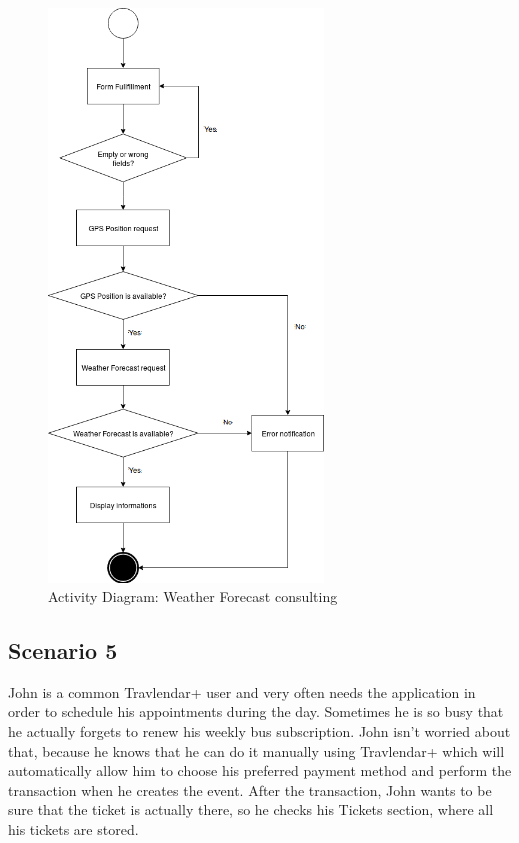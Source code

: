 \documentclass[numbers=noenddot, 12pt, a4paper, oneside]{scrbook}
\begin{document}
\begin{figure}[H]
	\centering
	\includegraphics[width=0.65\textwidth]{flows/Scenario4}
	\caption{Activity Diagram: Weather Forecast consulting}
\end{figure}

\subsection*{Scenario 5}

John is a common Travlendar+ user and very often needs the application in order to schedule his appointments during the day. Sometimes he is so busy that he actually forgets to renew his weekly bus subscription. John isn't worried about that, because he knows that he can do it manually using Travlendar+ which will automatically allow him to choose his preferred payment method and perform the transaction when he creates the event. After the transaction, John wants to be sure that the ticket is actually there, so he checks his Tickets section, where all his tickets are stored.
\\
\end{document}
